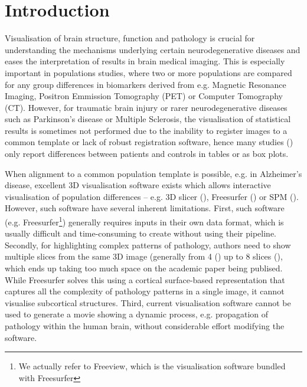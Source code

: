 \documentclass[final,times,twocolumn,authoryear]{elsarticle}
\begin{document}





\section{Introduction}
\label{intro}



Visualisation of brain structure, function and pathology is crucial for understanding the mechanisms underlying certain neurodegenerative diseases and eases the interpretation of results in brain medical imaging. This is especially important in populations studies, where two or more populations are compared for any group differences in biomarkers derived from e.g. Magnetic Resonance Imaging, Positron Emmission Tomography (PET) or Computer Tomography (CT). However, for traumatic brain injury or rarer neurodegenerative diseases such as Parkinson's disease or Multiple Sclerosis, the visualisation of statistical results is sometimes not performed due to the inability to register images to a common template or lack of robust registration software, hence many studies (\cite{coughlin2015neuroinflammation, mak2014subcortical, schoonheim2012subcortical, chard2002brain}) only report differences between patients and controls in tables or as box plots. 

When alignment to a common population template is possible, e.g. in Alzheimer's disease, excellent 3D visualisation software exists  which allows interactive visualisation of population differences -- e.g. 3D slicer (\cite{pieper20043d}), Freesurfer (\cite{fischl2012freesurfer}) or SPM (\cite{penny2011statistical}). However, such software have several inherent limitations. First, such software (e.g. Freesurfer\footnote{We actually refer to Freeview, which is the visualisation software bundled with Freesurfer}) generally requires inputs in their own data format, which is usually difficult and time-consuming to create without using their pipeline. Secondly, for highlighting complex patterns of pathology, authors need to show multiple slices from the same 3D image (generally from 4 (\cite{seeley2009neurodegenerative}) up to 8 slices (\cite{migliaccio2015mapping}), which ends up taking too much space on the academic paper being publised. While Freesurfer solves this using a cortical surface-based representation that captures all the complexity of pathology patterns in a single image, it cannot visualise subcortical structures. Third, current visualisation software cannot be used to generate a movie showing a dynamic process, e.g. propagation of pathology within the human brain, without considerable effort modifying the software.
\end{document}

